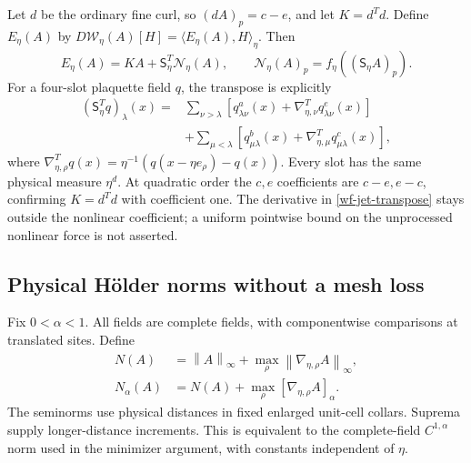 \documentclass[11pt]{article}
\theoremstyle{remark}
\newcommand{\norm}[1]{\left\|#1\right\|}
\begin{document}
Let $d$ be the ordinary fine curl, so $(dA)_p=c-e$, and
let $K=d^Td$. Define $E_\eta(A)$ by
$D\mathcal W_\eta(A)[H]=\langle E_\eta(A),H\rangle_\eta$.
Then
\begin{equation}\label{wf-force-factorization}
 E_\eta(A)=KA+\mathsf S_\eta^T\mathcal N_\eta(A),
 \qquad
 \mathcal N_\eta(A)_p=f_\eta((\mathsf S_\eta A)_p).
\end{equation}
For a four-slot plaquette field $q$, the transpose is
explicitly
\begin{equation}\label{wf-jet-transpose}
 \begin{split}
 (\mathsf S_\eta^Tq)_\lambda(x)
 ={}&\sum_{\nu>\lambda}\left[
       q_{\lambda\nu}^{a}(x)
                +\nabla_{\eta,\nu}^Tq_{\lambda\nu}^{e}(x)\right]\\
 &+\sum_{\mu<\lambda}\left[
       q_{\mu\lambda}^{b}(x)
                +\nabla_{\eta,\mu}^Tq_{\mu\lambda}^{c}(x)\right],
 \end{split}
\end{equation}
where $\nabla_{\eta,\rho}^Tq(x)
=\eta^{-1}(q(x-\eta e_\rho)-q(x))$. Every slot has the same
physical measure $\eta^d$. At quadratic order the $c,e$
coefficients are $c-e,e-c$, confirming $K=d^Td$ with
coefficient one. The derivative in
\eqref{wf-jet-transpose} stays outside the nonlinear
coefficient; a uniform pointwise bound on the unprocessed
nonlinear force is not asserted.

\subsection{Physical H\"older norms without a mesh loss}

Fix $0<\alpha<1$. All fields are complete fields, with
componentwise comparisons at translated sites. Define
\begin{equation}\label{wf-Nalpha}
 \begin{split}
 N(A)&=\norm{A}_\infty+
                  \max_\rho\norm{\nabla_{\eta,\rho}A}_\infty,\\
 N_\alpha(A)&=N(A)+
                  \max_\rho[\nabla_{\eta,\rho}A]_\alpha.
 \end{split}
\end{equation}
The seminorms use physical distances in fixed enlarged
unit-cell collars. Suprema supply longer-distance
increments. This is equivalent to the complete-field
$C^{1,\alpha}$ norm used in the minimizer argument, with
constants independent of $\eta$.
\end{document}
